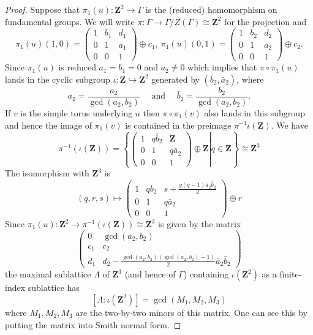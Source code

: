 \documentclass[11pt]{amsart}
\newcommand{\ZZ}{\mathbf{Z}}
\numberwithin{equation}{section}
\theoremstyle{definition}
\theoremstyle{remark}
\begin{document}
\begin{proof}
Suppose that $\pi_1(u)\colon\ZZ^2\to\Gamma$ is the (reduced) homomorphism on fundamental groups. We will write $\pi\colon\Gamma\to\Gamma/Z(\Gamma)\cong\ZZ^2$ for the projection and
\[\pi_1(u)(1,0)=\left(\begin{array}{ccc}
1 & b_1 & d_1\\
0 & 1 & a_1\\
0 & 0 & 1
\end{array}\right)\oplus c_1,\ \pi_1(u)(0,1)=\left(\begin{array}{ccc}
1 & b_2 & d_2\\
0 & 1 & a_2\\
0 & 0 & 1
\end{array}\right)\oplus c_2.\]
Since $\pi_1(u)$ is reduced $a_1=b_1=0$ and $a_2\neq 0$ which implies that $\pi\circ \pi_1(u)$ lands in the cyclic subgroup $\iota\colon\ZZ\hookrightarrow\ZZ^2$ generated by $(\bar{b}_2,\bar{a}_2)$, where
\[\bar{a}_2=\frac{a_2}{\gcd(a_2,b_2)}\quad\mbox{ and }\quad\bar{b}_2=\frac{b_2}{\gcd(a_2,b_2)}.\]
If $v$ is the simple torus underlying $u$ then $\pi\circ\pi_1(v)$ also lands in this subgroup and hence the image of $\pi_1(v)$ is contained in the preimage $\pi^{-1}\iota(\ZZ)$. We have
\[\pi^{-1}(\iota(\ZZ))=\left\{\left.\left(\begin{array}{ccc}1 & q\bar{b}_2 & \ZZ\\
0 & 1 & q\bar{a}_2\\
0 & 0 & 1 \end{array}\right)\oplus \ZZ\right| q\in\ZZ\right\}\cong\ZZ^3\]
The isomorphism with $\ZZ^3$ is
\[(q,r,s)\mapsto\left(\begin{array}{ccc}1 & q\bar{b}_2 & s+\frac{q(q-1)\bar{a}_2\bar{b}_2}{2}\\
0 & 1 & q\bar{a}_2\\
0 & 0 & 1 \end{array}\right)\oplus r\]
Since $\pi_1(u)\colon\ZZ^2\to\pi^{-1}(\iota(\ZZ))\cong\ZZ^3$ is given by the matrix
\[\left(\begin{array}{cc}
0 & \gcd(a_2,b_2)\\
c_1 & c_2\\
d_1 & d_2-\frac{\gcd(a_2,b_2)(\gcd(a_2,b_2)-1)}{2}\bar{a}_2\bar{b}_2
\end{array}\right)\]
the maximal sublattice $\Lambda$ of $\ZZ^3$ (and hence of $\Gamma$) containing $\iota(\ZZ^2)$ as a finite-index sublattice has
\[[\Lambda:\iota(\ZZ^2)]=\gcd(M_1,M_2,M_3)\]
where $M_1,M_2,M_3$ are the two-by-two minors of this matrix. One can see this by putting the matrix into Smith normal form.


\end{proof}
\end{document}
